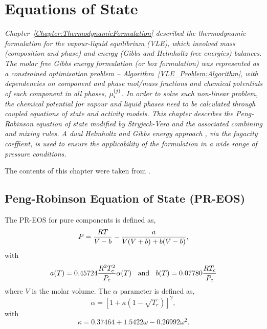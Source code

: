 

\chapter{Equations of State}\label{Chapter:EOSPR}

\begin{adjustwidth}{1cm}{1cm}
    {\it Chapter~\ref{Chapter:ThermodynamicFormulation} described the thermodynamic formulation for the vapour-liquid equilibrium (VLE), which involved mass (composition and phase) and energy (Gibbs and Helmholtz free energies) balances. The molar free Gibbs energy formulation (or box formulation) was represented as a constrained optimisation problem -- Algorithm~\ref{VLE_Problem:Algorithm}, with dependencies on component and phase mol/mass fractions and chemical potentials of each component in all phases, $\mfr[\mu]{i}{j}$. In order to solve such non-linear problem, the chemical potential for vapour and liquid phases  need to be calculated through coupled equations of state and activity models. This chapter describes the Peng-Robinson equation of state modified by Stryjeck-Vera and the associated combining and mixing rules. A dual Helmholtz and Gibbs energy approach \citep{wong_1992}, via the fugacity coeffient, is used to ensure the applicability of the formulation in a wide range of pressure conditions.   

\medskip

The contents of this chapter were taken from \citet{Gomes_MSc_1999} \citep[see also][]{gomes_2001}.
}
\end{adjustwidth}
\section{Peng-Robinson Equation of State (PR-EOS)}\label{Chapter:EOSPR:Section:PR}
The PR-EOS for pure components is defined as,
   \begin{equation}
      P = \frc{RT}{V-b} - \frc{a}{V(V+b) + b(V-b)}\label{Chapter:EOSPR:Section:PR:Eqn:PR},
   \end{equation}
with
   \begin{displaymath}
      a(T)=0.45724\frc{R^{2}T_{c}^{2}}{P_{c}}\alpha(T)\;\;\text{ and }\;\;b(T) = 0.07780\frc{RT_{c}}{P_{c}}
   \end{displaymath}
where $V$ is the molar volume. The $\alpha$ parameter is defined as,
   \begin{equation}
         \alpha = \left[1 + \kappa\left(1 - \sqrt{T_{r}}\right)\right]^{2},
   \end{equation}
with
   \begin{equation}
         \kappa = 0.37464 + 1.5422\omega - 0.26992\omega^{2}.\label{Chapter:EOSPR:Section:PR:Eqn:PR_k}
   \end{equation}

